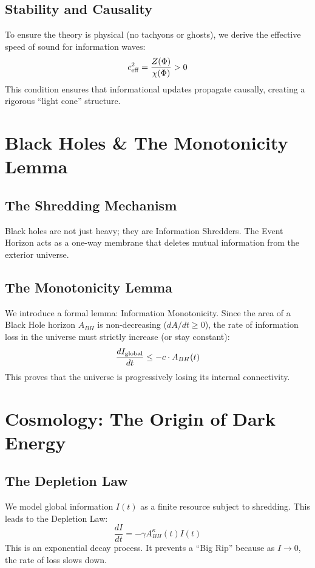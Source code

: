 \documentclass{article}
\begin{document}
\subsection{Stability and Causality}
To ensure the theory is physical (no tachyons or ghosts), we derive the effective speed of sound for information waves:
\begin{equation}
    c_{\rm eff}^2 = \frac{Z(\Phi)}{\chi(\Phi)} > 0
\end{equation}
This condition ensures that informational updates propagate causally, creating a rigorous ``light cone'' structure.

\section{Black Holes \& The Monotonicity Lemma}

\subsection{The Shredding Mechanism}
Black holes are not just heavy; they are Information Shredders. The Event Horizon acts as a one-way membrane that deletes mutual information from the exterior universe.

\subsection{The Monotonicity Lemma}
We introduce a formal lemma: Information Monotonicity.
Since the area of a Black Hole horizon $A_{BH}$ is non-decreasing ($dA/dt \ge 0$), the rate of information loss in the universe must strictly increase (or stay constant):
\begin{equation}
    \frac{d I_{\rm global}}{dt} \le -c \cdot A_{BH}(t)
\end{equation}
This proves that the universe is progressively losing its internal connectivity.

\section{Cosmology: The Origin of Dark Energy}

\subsection{The Depletion Law}
We model global information $I(t)$ as a finite resource subject to shredding. This leads to the Depletion Law:
\begin{equation}
    \frac{dI}{dt} = -\gamma A_{BH}^\kappa(t) I(t)
\end{equation}
This is an exponential decay process. It prevents a ``Big Rip'' because as $I \to 0$, the rate of loss slows down.
\end{document}
